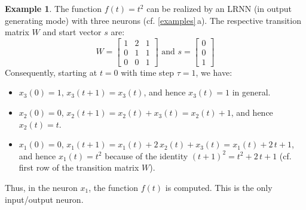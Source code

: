 \documentclass[twoside,11pt]{article}
\theoremstyle{definition}
\newtheorem{exmp}{Example}
\begin{document}
\begin{exmp}\label{parabola}
The function $f(t) = t^2$ can be realized by an LRNN (in output generating mode)
with three neurons (cf. \cref{examples}\,a). The respective transition matrix
$W$ and start vector $s$ are:
\[ W = \left[ \begin{array}{ccc}
	1 & 2 & 1\\
	0 & 1 & 1\\
	0 & 0 & 1
   \end{array} \right]
   \text{~and~} s = \left[ \begin{array}{c}
	0\\
	0\\
	1
   \end{array} \right]
\]
Consequently, starting at $t=0$ with time step $\tau=1$, we have:
\begin{itemize}
  \item $x_3(0) = 1$, $x_3(t+1) = x_3(t)$, and hence $x_3(t)=1$ in general.
  \item $x_2(0) = 0$, $x_2(t+1) = x_2(t)+x_3(t) = x_2(t)+1$, and hence $x_2(t)=t$.
  \item $x_1(0) = 0$, $x_1(t+1) = x_1(t)+ 2\,x_2(t) + x_3(t) = x_1(t)+ 2\,t +
	1$, and hence $x_1(t) = t^2$ because of the identity $(t+1)^2 = t^2 +
	2\,t + 1$ (cf. first row of the transition matrix $W$).
\end{itemize}
Thus, in the neuron $x_1$, the function $f(t)$ is computed. This is the only
input/output neuron.
\end{exmp}
\end{document}
